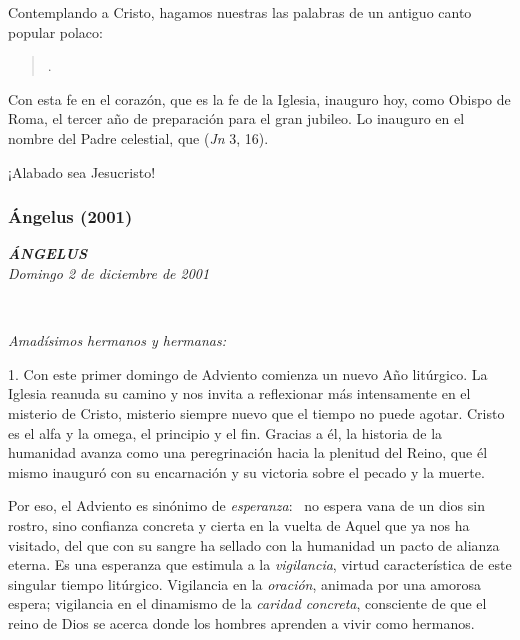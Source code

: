 Contemplando a Cristo, hagamos nuestras las palabras de un antiguo canto popular polaco:

\begin{quote} . \end{quote}

Con esta fe en el corazón, que es la fe de la Iglesia, inauguro hoy, como Obispo de Roma, el tercer año de preparación para el gran jubileo. Lo inauguro en el nombre del Padre celestial, que  (\emph{Jn} 3, 16).

¡Alabado sea Jesucristo!

\subsubsection{Ángelus (2001)} \textbf{\emph{ÁNGELUS\\[2\baselineskip]}}\emph{Domingo 2 de diciembre de 2001}

~

\emph{Amadísimos hermanos y hermanas:}

1. Con este primer domingo de Adviento comienza un nuevo Año litúrgico. La Iglesia reanuda su camino y nos invita a reflexionar más intensamente en el misterio de Cristo, misterio siempre nuevo que el tiempo no puede agotar. Cristo es el alfa y la omega, el principio y el fin. Gracias a él, la historia de la humanidad avanza como una peregrinación hacia la plenitud del Reino, que él mismo inauguró con su encarnación y su victoria sobre el pecado y la muerte.

Por eso, el Adviento es sinónimo de \emph{esperanza}:~ no espera vana de un dios sin rostro, sino confianza concreta y cierta en la vuelta de Aquel que ya nos ha visitado, del  que con su sangre ha sellado con la humanidad un pacto de alianza eterna. Es una esperanza que estimula a la \emph{vigilancia}, virtud característica de este singular tiempo litúrgico. Vigilancia en la \emph{oración}, animada por una amorosa espera; vigilancia en el dinamismo de la \emph{caridad concreta}, consciente de que el reino de Dios se acerca donde los hombres aprenden a vivir como hermanos.

